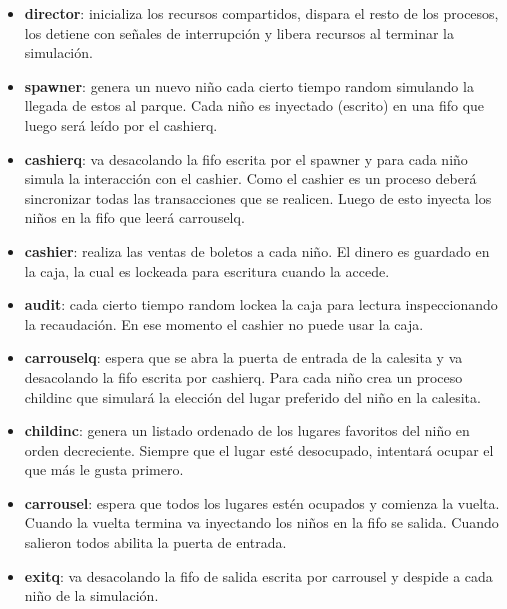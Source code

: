 \documentclass[a4paper,10pt]{article}
\begin{document}
\begin{itemize}
\item \textbf{director}: inicializa los recursos compartidos, dispara el resto de los procesos, los detiene con señales de interrupción y libera recursos al terminar la simulación.

\item \textbf{spawner}: genera un nuevo niño cada cierto tiempo random simulando la llegada de estos al parque. Cada niño es inyectado (escrito) en una fifo que luego será leído por el cashierq.

\item \textbf{cashierq}: va desacolando la fifo escrita por el spawner y para cada niño simula la interacción con el cashier. Como el cashier es un proceso deberá sincronizar todas las transacciones que se realicen. Luego de esto inyecta los niños en la fifo que leerá carrouselq.

\item \textbf{cashier}: realiza las ventas de boletos a cada niño. El dinero es guardado en la caja, la cual es lockeada para escritura cuando la accede.

\item \textbf{audit}: cada cierto tiempo random lockea la caja para lectura inspeccionando la recaudación. En ese momento el cashier no puede usar la caja.

\item \textbf{carrouselq}: espera que se abra la puerta de entrada de la calesita y va desacolando la fifo escrita por cashierq. Para cada niño crea un proceso childinc que simulará la elección del lugar preferido del niño en la calesita. 

\item \textbf{childinc}: genera un listado ordenado de los lugares favoritos del niño en orden decreciente. Siempre que el lugar esté desocupado, intentará ocupar el que más le gusta primero. 

\item \textbf{carrousel}: espera que todos los lugares estén ocupados y comienza la vuelta. Cuando la vuelta termina va inyectando los niños en la fifo se salida. Cuando salieron todos abilita la puerta de entrada.

\item \textbf{exitq}: va desacolando la fifo de salida escrita por carrousel y despide a cada niño de la simulación.

\end{itemize}
\end{document}
